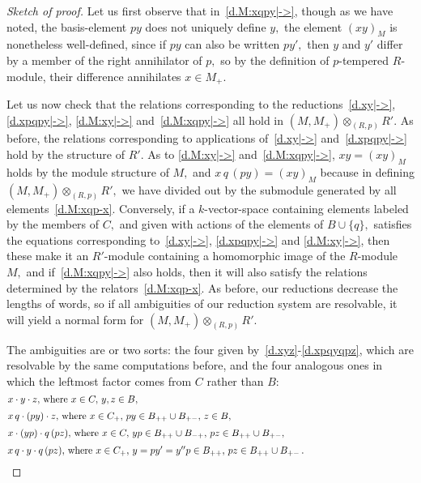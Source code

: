 \documentclass{amsart}
\begin{document}
\begin{proof}[Sketch of proof]
Let us first observe that in~\eqref{d.M:xqpy|->}, though as
we have noted, the
basis-element $py$ does not uniquely define $y,$ the element
$(xy)_M$ is nonetheless well-defined, since if $py$ can also
be written $py',$ then $y$ and $y'$ differ by a member of the
right annihilator of $p,$
so by the definition of $\!p\!$-tempered $\!R\!$-module,
their difference annihilates $x\in M_+.$

Let us now check that the relations corresponding
to the reductions~\eqref{d.xy|->}, \eqref{d.xpqpy|->},
\eqref{d.M:xy|->} and~\eqref{d.M:xqpy|->}
all hold in $(M,M_+)\otimes_{(R,p)} R'.$
As before, the relations corresponding to applications
of~\eqref{d.xy|->} and~\eqref{d.xpqpy|->}
hold by the structure of $R'.$
As to \eqref{d.M:xy|->} and~\eqref{d.M:xqpy|->}, $xy=(xy)_M$
holds by the
module structure of $M,$ and $x\,q\,(py)=(xy)_M$ because
in defining $(M,M_+)\otimes_{(R,p)} R',$
we have divided out by the submodule
generated by all elements~\eqref{d.M:xqp-x}.
Conversely, if a $\!k\!$-vector-space containing
elements labeled by the members of $C,$ and given with actions
of the elements of $B\cup\{q\},$ satisfies the equations
corresponding to~\eqref{d.xy|->}, \eqref{d.xpqpy|->} and
\eqref{d.M:xy|->}, then these make it
an $\!R'\!$-module containing a homomorphic image
of the $\!R\!$-module $M,$ and if~\eqref{d.M:xqpy|->} also
holds, then it will also satisfy the relations
determined by the relators~\eqref{d.M:xqp-x}.
As before, our reductions decrease the lengths of words,
so if all ambiguities of our reduction system are resolvable,
it will yield a normal form for $(M,M_+)\otimes_{(R,p)} R'.$

The ambiguities are or two sorts: the four given
by~\eqref{d.xyz}-\eqref{d.xpqyqpz}, which are resolvable by the
same computations before, and the four analogous
ones in which the leftmost factor comes from $C$ rather than $B:$
\begin{equation}\begin{minipage}[c]{35pc}\label{d.M:xyz}
$x\cdot y\cdot z,$ where $x\in C,$ $y,z\in B,$
\end{minipage}\end{equation}
\begin{equation}\begin{minipage}[c]{35pc}\label{d.M:xqpyz}
$x\,q \cdot (py)\cdot z,$ where
$x\in C_+,$
$py\in B_{++}\cup B_{+-},$
$z\in B,$
\end{minipage}\end{equation}
\begin{equation}\begin{minipage}[c]{35pc}\label{d.M:xypqpz}
$x\cdot (yp) \cdot q\,(pz),$ where
$x\in C,$
$yp\in B_{++}\cup B_{-+},$
$pz\in B_{++}\cup B_{+-},$
\end{minipage}\end{equation}
\begin{equation}\begin{minipage}[c]{35pc}\label{d.M:xqyqpz}
$x\,q \cdot y\cdot q\,(pz),$ where
$x\in C_+,$
$y=py'=y''p\in B_{++},$
$pz\in B_{++}\cup B_{+-}\,.$
\end{minipage}\end{equation}


\end{proof}
\end{document}
